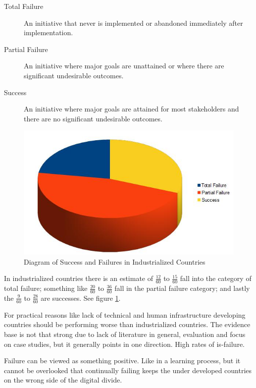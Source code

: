 \begin{description}
\item[Total Failure] An initiative that never is implemented or abandoned immediately after implementation.
\item[Partial Failure] An initiative where major goals are unattained or where there are significant undesirable outcomes.
\item[Success] An initiative where major goals are attained for most stakeholders and there are no significant undesirable outcomes.
\end{description}




\begin{figure}
\centering
\includegraphics[width=\textwidth]{literature/img/failChart}
\caption{Diagram of Success and Failures in Industrialized Countries}
\label{fig:failchart}
\end{figure}

In industrialized countries there is an estimate of $\frac{12}{60}$ to $\frac{15}{60}$ fall into the category of total failure; something like $\frac{20}{60}$ to $\frac{36}{60}$ fall in the partial failure category; and lastly the $\frac{9}{60}$ to $\frac{28}{60}$ are successes. See figure \ref{fig:failchart}.

For practical reasons like lack of technical and human infrastructure developing countries should be performing worse than industrialized countries.
The evidence base is not that strong due to lack of literature in general, evaluation and focus on case studies, but it generally points in one direction. High rates of \gls{is}-failure.

Failure can be viewed as something positive. 
Like in a learning process, but it cannot be overlooked that continually failing keeps the under developed countries on the wrong side of the digital divide. 

